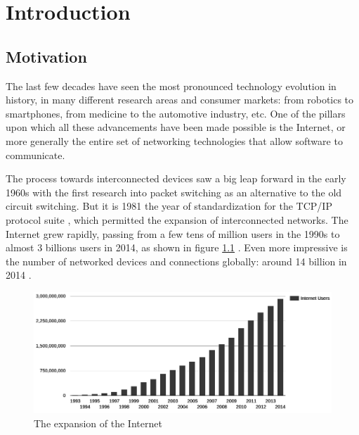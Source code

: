 \chapter{Introduction}
\label{chap:introduction}

\section{Motivation}
The last few decades have seen the most pronounced technology evolution in history, in many different research areas and consumer markets: from robotics to smartphones, from medicine to the automotive industry, etc. One of the pillars upon which all these advancements have been made possible is the Internet, or more generally the entire set of networking technologies that allow software to communicate.


The process towards interconnected devices saw a big leap forward in the early 1960s with the first research into packet switching as an alternative to the old circuit switching. But it is 1981 the year of standardization for the TCP/IP protocol suite \cite{rfc793}, which permitted the expansion of interconnected networks. The Internet grew rapidly, passing from a few tens of million users in the 1990s to almost 3 billions users in 2014, as shown in figure \ref{fig:internet_growth} \cite{internetlivestats}. Even more impressive is the number of networked devices and connections globally: around 14 billion in 2014 \cite{cisco}.

\begin{figure}[!htb]
\centering
\includegraphics[width=\textwidth]{images/internet_growth}
\caption{The expansion of the Internet}
\label{fig:internet_growth}
\end{figure}

